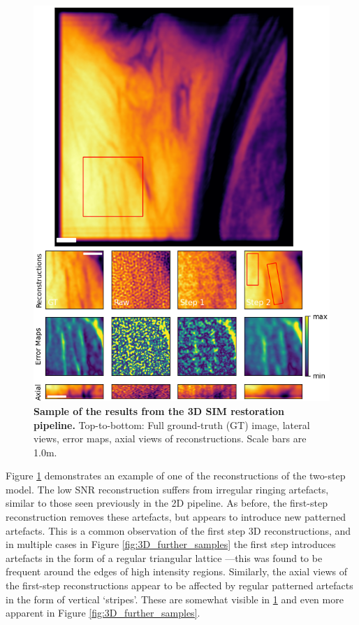 \documentclass[12pt]{article}
\begin{document}
\begin{figure}[hbtp]
    \includegraphics[scale=1.05, center]{figures/vh_error.png}
    \caption{\textbf{Sample of the results from the 3D SIM restoration pipeline.}
    Top-to-bottom: Full ground-truth (GT) image, lateral views, error maps, axial views of reconstructions.
    Scale bars are 1.0\textmu m.}
    \label{fig:vh_samples_error}
\end{figure}

Figure \ref{fig:vh_samples_error} demonstrates an example of one of the reconstructions of the two-step model.
The low SNR reconstruction suffers from irregular ringing artefacts, similar to those seen previously in the 2D pipeline.
As before, the first-step reconstruction removes these artefacts,
but appears to introduce new patterned artefacts.
This is a common observation of the first step 3D reconstructions,
and in multiple cases in Figure \ref{fig:3D_further_samples} the first step introduces artefacts in the form of a regular triangular lattice
---this was found to be frequent around the edges of high intensity regions.
Similarly, the axial views of the first-step reconstructions appear to be affected by regular patterned artefacts in the form of vertical `stripes'.
These are somewhat visible in \ref{fig:vh_samples_error} and even more apparent in Figure \ref{fig:3D_further_samples}.
\end{document}
